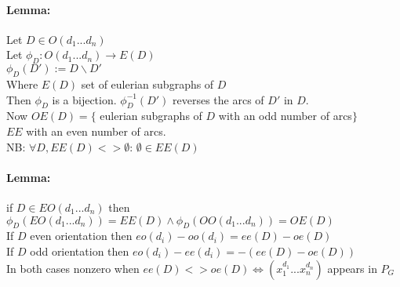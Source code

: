 \documentclass[12pt]{article}
\begin{document}
\paragraph{Lemma:} Let $D \in O(d_1 ... d_n)$\\
Let $\phi_D : O(d_1 ... d_n) \rightarrow E(D)$\\
$\phi_D(D') := D \backslash D'$\\
Where $E(D)$ set of eulerian subgraphs of $D$\\
Then $\phi_D$ is a bijection. $\phi_D^{-1}(D')$ reverses the arcs of $D'$ in $D$.\\
Now $OE(D) = \{$ eulerian subgraphs of $D$ with an odd number of arcs$\}$\\
$EE$ with an even number of arcs.\\
NB: $\forall D, EE(D) <> \emptyset$: $\emptyset \in EE(D)$\\

\paragraph{Lemma:} if $D \in EO(d_1 ... d_n)$ then $\phi_D(EO(d_1 ... d_n)) = EE(D) \wedge \phi_D(OO(d_1 ... d_n)) = OE(D)$\\
If $D$ even orientation then $eo(d_i) - oo(d_i) = ee(D) - oe(D)$\\
If $D$ odd orientation then $eo(d_i) - ee(d_i) = -(ee(D) - oe(D))$\\
In both cases nonzero when $ee(D) <> oe(D) \Leftrightarrow (x_1^{d_1} ... x_n^{d_n})$ appears in $P_G$\\
\end{document}
